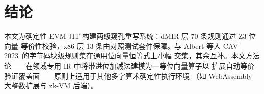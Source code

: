 \section{结论}

本文为确定性 EVM JIT 构建两级窥孔重写系统：dMIR 层 70 条规则通过 Z3 位向量
等价性校验，x86 层 13 条由对照测试套件保障。与 Albert 等人 CAV
2023~\cite{verified_evm_cav23}的字节码块级规则集在通用位向量恒等式上小幅
交集，其余互补。本文方法论——在领域专用 IR 中将带进位加减法建模为一等位向量算子以
扩展自动等价验证覆盖面——原则上适用于其他多字算术确定性执行环境
（如 WebAssembly 大整数扩展与 zk-VM 后端）。
